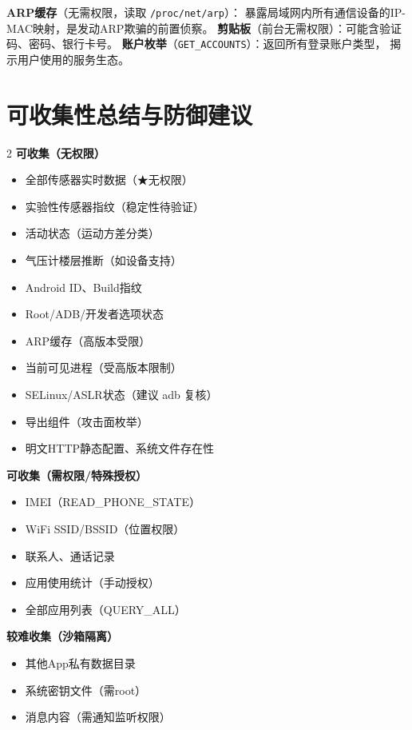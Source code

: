 \documentclass[10pt,a4paper]{article}
\begin{document}
\textbf{ARP缓存}（无需权限，读取 \texttt{/proc/net/arp}）：
暴露局域网内所有通信设备的IP-MAC映射，是发动ARP欺骗的前置侦察。
\textbf{剪贴板}（前台无需权限）：可能含验证码、密码、银行卡号。
\textbf{账户枚举}（\texttt{GET\_ACCOUNTS}）：返回所有登录账户类型，
揭示用户使用的服务生态。

\section{可收集性总结与防御建议}

\begin{multicols}{2}
\noindent\textbf{\color{novel}可收集（无权限）}
\begin{itemize}
\item 全部传感器实时数据（★无权限）
\item 实验性传感器指纹（稳定性待验证）
\item 活动状态（运动方差分类）
\item 气压计楼层推断（如设备支持）
\item Android ID、Build指纹
\item Root/ADB/开发者选项状态
\item ARP缓存（高版本受限）
\item 当前可见进程（受高版本限制）
\item SELinux/ASLR状态（建议 adb 复核）
\item 导出组件（攻击面枚举）
\item 明文HTTP静态配置、系统文件存在性
\end{itemize}

\columnbreak
\noindent\textbf{\color{highlight}可收集（需权限/特殊授权）}
\begin{itemize}
\item IMEI（READ\_PHONE\_STATE）
\item WiFi SSID/BSSID（位置权限）
\item 联系人、通话记录
\item 应用使用统计（手动授权）
\item 全部应用列表（QUERY\_ALL）
\end{itemize}

\noindent\textbf{\color{gray}较难收集（沙箱隔离）}
\begin{itemize}
\item 其他App私有数据目录
\item 系统密钥文件（需root）
\item 消息内容（需通知监听权限）
\end{itemize}
\end{multicols}
\end{document}
